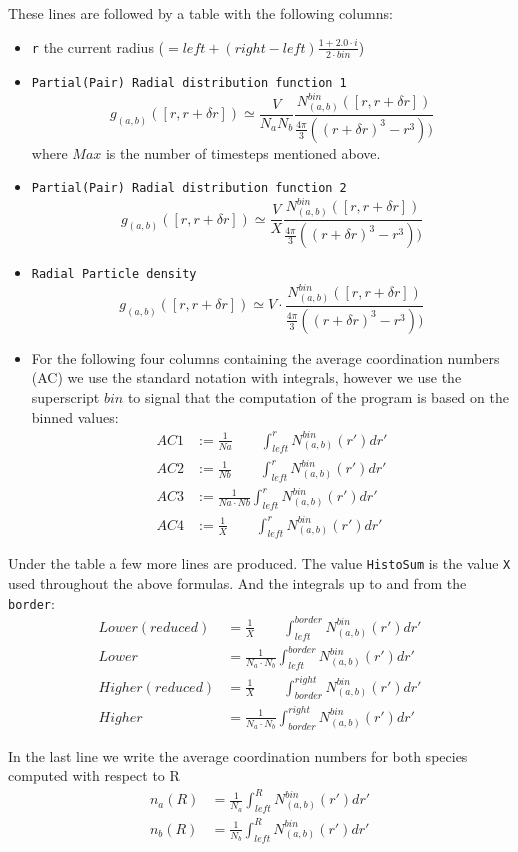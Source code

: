 These lines are followed by a table with the following columns:
\begin{itemize}
\item {\tt r} the current radius ($=left + (right - left)\frac{1+2.0\cdot i}{2\cdot bin}$)
\item {\tt Partial(Pair) Radial distribution function 1}
\begin{equation*}
g_{(a,b)}([r,r+\delta r]) \simeq \frac{V}{N_a N_b} \frac{N^{bin}_{(a, b)}([r, r+\delta r])}{\frac{4 \pi}{3}((r+\delta r)^3 - r^3))}
\end{equation*}
where $Max$ is the number of timesteps mentioned above.

\item {\tt Partial(Pair) Radial distribution function 2}
\begin{equation*}
g_{(a,b)}([r,r+\delta r]) \simeq \frac{V}{X} \frac{N^{bin}_{(a, b)}([r, r+\delta r])}{\frac{4 \pi}{3}((r+\delta r)^3 - r^3))}
\end{equation*}

\item {\tt Radial Particle density}
\begin{equation*}
g_{(a,b)}([r,r+\delta r]) \simeq V \cdot \frac{N^{bin}_{(a, b)}([r, r+\delta r])}{\frac{4 \pi}{3}((r+\delta r)^3 - r^3))}
\end{equation*}

\item For the following four columns containing the average coordination numbers (AC) we use the standard notation with integrals, however we use the superscript $bin$ to signal that the computation of the program is based on the binned values:
\begin{align*}
AC1 &:= \frac{1}{Na} \qquad   \int_{left}^r N^{bin}_{(a,b)}(r')dr' \\
AC2 &:= \frac{1}{Nb} \qquad   \int_{left}^r N^{bin}_{(a,b)}(r')dr' \\
AC3 &:= \frac{1}{Na\cdot Nb }    \int_{left}^r N^{bin}_{(a,b)}(r')dr' \\
AC4 &:= \frac{1}{X} \qquad  \int_{left}^r N_{(a,b)}^{bin}(r')dr'
\end{align*}
\end{itemize}

\bigbreak
Under the table a few more lines are produced.
The value {\tt HistoSum} is the value {\tt X} used throughout the above formulas.
And the integrals up to and from the {\tt border}:
\begin{align*}
Lower(reduced) &= \frac{1}{X} \qquad \int_{left}^{border}N_{(a,b)}^{bin}(r')dr' \\
Lower &= \frac{1}{N_a \cdot N_b} \int_{left}^{border}N_{(a,b)}^{bin}(r')dr' \\
Higher(reduced) &= \frac{1}{X} \qquad \int_{border}^{right}N_{(a,b)}^{bin}(r')dr' \\
Higher &= \frac{1}{N_a \cdot N_b} \int_{border}^{right}N_{(a,b)}^{bin}(r')dr' 
\end{align*}


In the last line we write the average coordination numbers for both species computed with respect to R
\begin{align*}
n_{a}(R) &= \frac{1}{N_a} \int_{left}^R N^{bin}_{(a,b)}(r')dr'\\
n_{b}(R) &= \frac{1}{N_b} \int_{left}^R N^{bin}_{(a,b)}(r')dr'
\end{align*}
